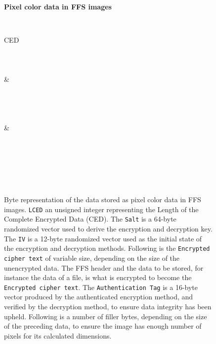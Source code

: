 \begin{figure}[!htb]
	\label{fig:app_bin_pixels}
	\centering
    \textbf{Pixel color data in FFS images}\par\medskip

	\begin{bytefield}[bitwidth=0.0312\textwidth]{32}
		 \\
		\begin{rightwordgroup}{CED}\\
			 \\
			 \\
			 \\
			 & \\
			 \\
			 \\
			\skippedwords \\
			 \\
			 & 
		\end{rightwordgroup} \\
		 \\
		 \\
		\skippedwords \\
		 \\
	\end{bytefield}
	\caption[Byte representation of the data stored as pixel color data in FFS images]{Byte representation of the data stored as pixel color data in FFS images. \texttt{LCED} an unsigned integer representing the Length of the Complete Encrypted Data (CED). The \texttt{Salt} is a 64-byte randomized vector used to derive the encryption and decryption key. The \texttt{IV} is a 12-byte randomized vector used as the initial state of the encryption and decryption methods. Following is the \texttt{Encrypted cipher text} of variable size, depending on the size of the unencrypted data. The FFS header and the data to be stored, for instance the data of a file, is what is encrypted to become the \texttt{Encrypted cipher text}. The \texttt{Authentication Tag} is a 16-byte vector produced by the authenticated encryption method, and verified by the decryption method, to ensure data integrity has been upheld. Following is a number of filler bytes, depending on the size of the preceding data, to ensure the image has enough number of pixels for its calculated dimensions.}
\end{figure}